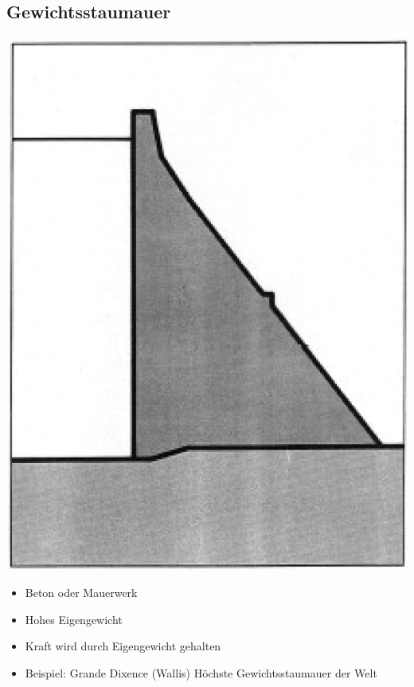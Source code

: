 \subsection{Gewichtsstaumauer}
\begin{minipage}[c]{0.38\columnwidth}
    \includegraphics[width=0.98\columnwidth, align=c]{images/Talsperre_2.jpg}
\end{minipage}
\hfill
\begin{minipage}[c]{0.58\columnwidth}
    \begin{itemize}
  \item Beton oder Mauerwerk
  \item Hohes Eigengewicht
  \item Kraft wird durch Eigengewicht gehalten
  \item Beispiel: Grande Dixence (Wallis) Höchste Gewichtsstaumauer der Welt
\end{itemize}

\end{minipage}

